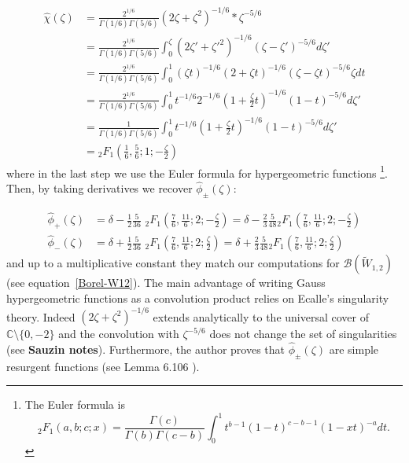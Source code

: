 \documentclass{article}
\newcommand{\C}{\mathbb{C}}
\begin{document}
\begin{align*}
\hat{\chi}(\zeta)&=\frac{2^{1/6}}{\Gamma(1/6)\Gamma(5/6)}(2\zeta+\zeta^2)^{-1/6}\ast \zeta^{-5/6}\\
&=\frac{2^{1/6}}{\Gamma(1/6)\Gamma(5/6)}\int_0^{\zeta}(2\zeta'+\zeta'^2)^{-1/6} (\zeta-\zeta')^{-5/6}d\zeta'\\
&=\frac{2^{1/6}}{\Gamma(1/6)\Gamma(5/6)}\int_0^{1}(\zeta t)^{-1/6}(2+\zeta t)^{-1/6} (\zeta-\zeta t)^{-5/6} \zeta dt\\
&=\frac{2^{1/6}}{\Gamma(1/6)\Gamma(5/6)}\int_0^{1} t^{-1/6} 2^{-1/6}(1+\frac{\zeta}{2} t)^{-1/6} (1-t)^{-5/6}d\zeta'\\
&=\frac{1}{\Gamma(1/6)\Gamma(5/6)}\int_0^{1} t^{-1/6} (1+\frac{\zeta}{2} t)^{-1/6} (1-t)^{-5/6}d\zeta'\\
&={}_2F_1\left(\frac{1}{6},\frac{5}{6};1;-\frac{\zeta}{2}\right)
\end{align*}
where in the last step we use the Euler formula for hypergeometric functions \footnote{The Euler formula is \begin{equation}\label{Euler formula}
{}_{2}F_1\left(a,b;c;x\right)=\frac{\Gamma(c)}{\Gamma(b)\Gamma(c-b)}\int_0^1 t^{b-1}(1-t)^{c-b-1}(1-xt)^{-a}dt.
\end{equation}}. Then, by taking derivatives we recover $\hat{\phi}_{\pm}(\zeta)$: 

\begin{align*}
\hat{\phi}_+(\zeta)&=\delta-\frac{1}{2}\frac{5}{36}\,\, {}_2F_1\left(\frac{7}{6},\frac{11}{6};2;-\frac{\zeta}{2}\right)=\delta-\frac{2}{3}\frac{5}{48} {}_2F_1\left(\frac{7}{6},\frac{11}{6};2;-\frac{\zeta}{2}\right)\\
\hat{\phi}_-(\zeta)&=\delta+\frac{1}{2}\frac{5}{36}\,\, {}_2F_1\left(\frac{7}{6},\frac{11}{6};2;\frac{\zeta}{2}\right)=\delta+\frac{2}{3}\frac{5}{48} {}_2F_1\left(\frac{7}{6},\frac{11}{6};2;\frac{\zeta}{2}\right)
\end{align*} 
and up to a multiplicative constant they match our computations for $\mathcal{B}(\tilde{W}_{1,2})$ (see equation~\eqref{Borel-W12}).
The main advantage of writing Gauss hypergeometric functions as a convolution product relies on Ecalle's singularity theory. Indeed $(2\zeta+\zeta^2)^{-1/6}$ extends analytically to the universal cover of $\C\setminus\lbrace 0,-2\rbrace$ and the convolution with $\zeta^{-5/6}$ does not change the set of singularities (see \textbf{Sauzin notes}). Furthermore, the author proves that $\hat{\phi}_{\pm}(\zeta)$ are simple resurgent functions (see Lemma 6.106 \cite{MS}). %
\end{document}
